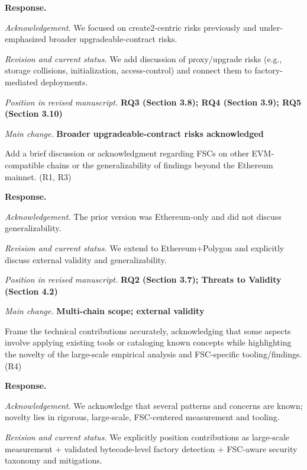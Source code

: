 \documentclass[acmsmall]{acmart}
\begin{document}
	\noindent
	\textbf{Response.}

	\textit{Acknowledgement.} We focused on create2-centric risks previously and under-emphasized
	broader upgradeable-contract risks.

	\textit{Revision and current status.} We add discussion of proxy/upgrade risks (e.g., storage
	collisions, initialization, access-control) and connect them to factory-mediated deployments.

	\textit{Position in revised manuscript.}
	{\color{red}\textbf{RQ3 (Section 3.8); RQ4 (Section 3.9); RQ5 (Section 3.10)}}

	\textit{Main change.} {\color{blue}\textbf{Broader upgradeable-contract risks acknowledged}}

	\begin{tcolorbox}
		[commentbox,title=Editor/AE -- Comment 7.3] Add a brief discussion or acknowledgment
		regarding FSCs on other EVM-compatible chains or the generalizability of findings beyond the
		Ethereum mainnet. (R1, R3)
	\end{tcolorbox}

	\noindent
	\textbf{Response.}

	\textit{Acknowledgement.} The prior version was Ethereum-only and did not discuss generalizability.

	\textit{Revision and current status.} We extend to Ethereum+Polygon and explicitly discuss
	external validity and generalizability.

	\textit{Position in revised manuscript.} {\color{red}\textbf{RQ2 (Section 3.7); Threats to Validity (Section 4.2)}}

	\textit{Main change.} {\color{blue}\textbf{Multi-chain scope; external validity}}

	\begin{tcolorbox}
		[commentbox,title=Editor/AE -- Comment 7.4] Frame the technical contributions accurately, acknowledging
		that some aspects involve applying existing tools or cataloging known concepts while highlighting
		the novelty of the large-scale empirical analysis and FSC-specific tooling/findings. (R4)
	\end{tcolorbox}

	\noindent
	\textbf{Response.}

	\textit{Acknowledgement.} We acknowledge that several patterns and concerns are known; novelty lies
	in rigorous, large-scale, FSC-centered measurement and tooling.

	\textit{Revision and current status.} We explicitly position contributions as large-scale
	measurement + validated bytecode-level factory detection + FSC-aware security taxonomy and
	mitigations.
\end{document}

